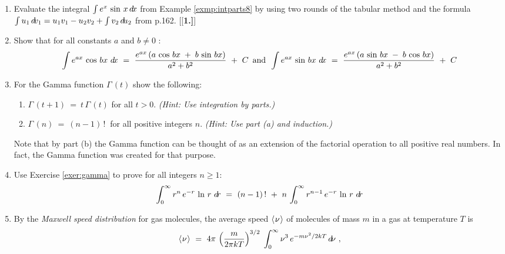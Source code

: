 {\begin{enumerate}[\bfseries 1.]
 \item Evaluate the integral $\int e^x\,\sin\,x\,d\!x$ from Example
 \ref{exmp:intparts8} by using two rounds of the tabular method and the formula
 $\int u_1\,d\!v_1 = u_1v_1 - u_2v_2 + \int v_2\,d\!u_2$ from p.162.
[{[\bfseries 1.]}]
 \item\label{exer:eaxtrigbx} Show that for all constants $a$ and $b \ne 0$ :
\begin{displaymath}
\int e^{ax}\,\cos\,bx~d\!x ~=~ \frac{e^{ax}\,(a\,\cos\,bx \;+\; b\,\sin\,bx)}{a^2 + b^2} ~+~ C
\enskip\text{and}\enskip
\int e^{ax}\,\sin\,bx~d\!x ~=~ \frac{e^{ax}\,(a\,\sin\,bx \;-\; b\,\cos\,bx)}{a^2 + b^2} ~+~ C
\end{displaymath}
\newpage
 \item\label{exer:gamma} For the Gamma function $\Gamma\,(t)$ show the following:
  \begin{enumerate}[\bfseries (a)]
   \item $\Gamma\,(t + 1) ~=~ t\,\Gamma\,(t)$ for all $t > 0$. \emph{(Hint:
    Use integration by parts.)}
   \item $\Gamma\,(n) ~=~ (n-1)\,!~$ for all positive integers $n$. \emph{(Hint:
    Use part (a) and induction.)}
  \end{enumerate}
 Note that by part (b) the Gamma function can be thought of as an extension of
 the factorial operation to all positive real numbers. In fact, the Gamma
 function was created for that purpose.
 \item Use Exercise \ref{exer:gamma} to prove for all integers $n \ge 1$:
\[
\int_0^{\infty} r^n\,e^{-r}\,\ln\,r~d\!r ~=~
 (n-1)\,! ~+~ n\,\int_0^{\infty} r^{n-1}\,e^{-r}\,\ln\,r~d\!r
\]
 \item By the \emph{Maxwell speed distribution} for gas molecules, the average
 speed $\langle\mspace{1mu}\nu\mspace{1mu}\rangle$ of molecules of mass $m$ in a gas at temperature $T$ is
\[
\langle\mspace{1mu}\nu\mspace{1mu}\rangle ~=~ 4\pi\,\left(\frac{m}{2\pi kT}\right)^{3/2}\;
              \int_0^{\infty} \nu^3\,e^{-m\nu^2/2kT}\,d\!\nu ~,
\]
\end{enumerate}}
